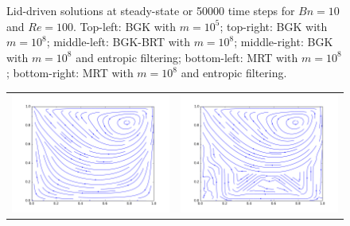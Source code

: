 \begin{figure}
\begin{tabulary}{\linewidth}{c c}
	\end{tabulary}
	\caption{Lid-driven solutions at steady-state or 50000 time steps for $Bn = 10$ and $Re = 100$. Top-left: BGK with $m = 10^5$; top-right: BGK with $m = 10^8$; middle-left: BGK-BRT with $m = 10^8$; middle-right: BGK with $m = 10^8$ and entropic filtering; bottom-left: MRT with $m = 10^8$; bottom-right: MRT with $m = 10^8$ and entropic filtering.}
	\label{fig:lid-Bn10-Re100}
\end{figure}

\begin{figure}
	\centering
	\begin{tabulary}{\linewidth}{c c}
		\includegraphics[width=\figwid]{figs/lid/bingham_100_bgk-5_Bn10_Re1000/sl_step-000037145}
		&
		\includegraphics[width=\figwid]{figs/lid/bingham_100_bgk-8_Bn10_Re1000/sl_step-000050000}

\end{tabulary}
\end{figure}
